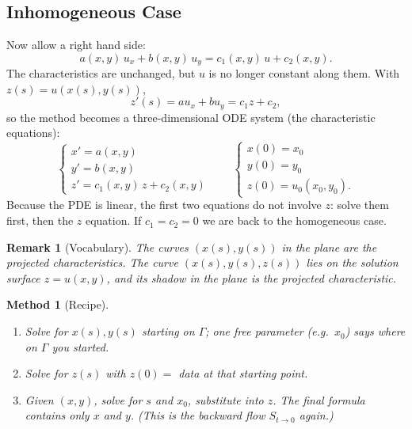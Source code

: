 \documentclass{article}
\newtheorem{remark}{Remark}
\newtheorem{method}{Method}
\begin{document}
\subsection{Inhomogeneous Case}
Now allow a right hand side:
\begin{equation}
    a(x,y)\,u_x + b(x,y)\,u_y = c_1(x,y)\,u + c_2(x,y).
\end{equation}
The characteristics are unchanged, but $u$ is no longer constant along them. With $z(s) = u(x(s), y(s))$,
\begin{equation}
    z'(s) = a u_x + b u_y = c_1 z + c_2,
\end{equation}
so the method becomes a three-dimensional ODE system (the characteristic equations):
\begin{equation}
    \begin{cases}
        x' = a(x,y) \\
        y' = b(x,y) \\
        z' = c_1(x,y)\, z + c_2(x,y)
    \end{cases}
    \qquad
    \begin{cases}
        x(0) = x_0 \\
        y(0) = y_0 \\
        z(0) = u_0(x_0, y_0).
    \end{cases}
\end{equation}
Because the PDE is linear, the first two equations do not involve $z$: solve them first, then the $z$ equation. If $c_1 = c_2 = 0$ we are back to the homogeneous case.
\begin{remark}[Vocabulary]
    The curves $(x(s), y(s))$ in the plane are the \emph{projected characteristics}. The curve $(x(s), y(s), z(s))$ lies on the solution surface $z = u(x,y)$, and its shadow in the plane is the projected characteristic.
\end{remark}
\begin{method}[Recipe]
    \begin{enumerate}[label=(\arabic*)]
        \item Solve for $x(s), y(s)$ starting on $\Gamma$; one free parameter (e.g.\ $x_0$) says where on $\Gamma$ you started.
        \item Solve for $z(s)$ with $z(0) =$ data at that starting point.
        \item Given $(x,y)$, solve for $s$ and $x_0$, substitute into $z$. The final formula contains only $x$ and $y$. (This is the backward flow $S_{t\to0}$ again.)
    \end{enumerate}
\end{method}
\end{document}
